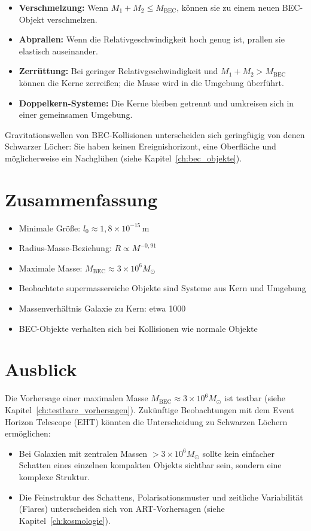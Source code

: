 \begin{itemize}
    \item \textbf{Verschmelzung:} Wenn \( M_1 + M_2 \leq M_{\text{BEC}} \), 
          können sie zu einem neuen BEC-Objekt verschmelzen.
    \item \textbf{Abprallen:} Wenn die Relativgeschwindigkeit hoch genug ist, 
          prallen sie elastisch auseinander.
    \item \textbf{Zerrüttung:} Bei geringer Relativgeschwindigkeit und 
          \( M_1 + M_2 > M_{\text{BEC}} \) können die Kerne zerreißen; 
          die Masse wird in die Umgebung überführt.
    \item \textbf{Doppelkern-Systeme:} Die Kerne bleiben getrennt und 
          umkreisen sich in einer gemeinsamen Umgebung.
\end{itemize}

Gravitationswellen von BEC-Kollisionen unterscheiden sich geringfügig 
von denen Schwarzer Löcher: Sie haben keinen Ereignishorizont, eine 
Oberfläche und möglicherweise ein Nachglühen (siehe Kapitel~\ref{ch:bec_objekte}).

\section{Zusammenfassung}
\label{app:bec_zusammenfassung}

\begin{itemize}
    \item Minimale Größe: \( l_0 \approx 1,8 \times 10^{-15} \, \text{m} \)
    \item Radius-Masse-Beziehung: \( R \propto M^{-0,91} \)
    \item Maximale Masse: \( M_{\text{BEC}} \approx 3 \times 10^6 M_{\odot} \)
    \item Beobachtete supermassereiche Objekte sind Systeme aus Kern und Umgebung
    \item Massenverhältnis Galaxie zu Kern: etwa 1000
    \item BEC-Objekte verhalten sich bei Kollisionen wie normale Objekte
\end{itemize}

\section{Ausblick}
\label{app:bec_ausblick}

Die Vorhersage einer maximalen Masse \( M_{\text{BEC}} \approx 3 \times 10^6 M_{\odot} \) 
ist testbar (siehe Kapitel~\ref{ch:testbare_vorhersagen}). Zukünftige Beobachtungen mit dem 
Event Horizon Telescope (EHT) könnten die Unterscheidung zu Schwarzen Löchern 
ermöglichen:

\begin{itemize}
    \item Bei Galaxien mit zentralen Massen \( > 3 \times 10^6 M_{\odot} \) 
          sollte kein einfacher Schatten eines einzelnen kompakten Objekts 
          sichtbar sein, sondern eine komplexe Struktur.
    \item Die Feinstruktur des Schattens, Polarisationsmuster und 
          zeitliche Variabilität (Flares) unterscheiden sich von 
          ART-Vorhersagen (siehe Kapitel~\ref{ch:kosmologie}).
\end{itemize}